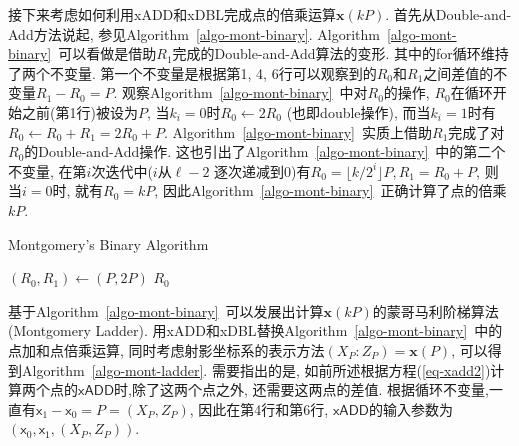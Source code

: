 
接下来考虑如何利用\textsf{xADD}和\textsf{xDBL}完成点的倍乘运算$\mathbf{x}(kP)$.
首先从Double-and-Add方法说起, 参见Algorithm~\ref{algo-mont-binary}. 
Algorithm~\ref{algo-mont-binary}~可以看做是借助$R_1$完成的Double-and-Add算法的变形.
其中的\textsf{for}循环维持了两个不变量. 
第一个不变量是根据第1, 4, 6行可以观察到的$R_0$和$R_1$之间差值的不变量$R_1-R_0 = P$.
观察Algorithm~\ref{algo-mont-binary}~中对$R_0$的操作, $R_0$在循环开始之前(第1行)被设为$P$,
当$k_i=0$时$R_0\leftarrow 2R_0$ (也即double操作), 
而当$k_i=1$时有$R_0\leftarrow R_0 + R_1 = 2R_0 + P$.
Algorithm~\ref{algo-mont-binary}~实质上借助$R_1$完成了对$R_0$的Double-and-Add操作.
这也引出了Algorithm~\ref{algo-mont-binary}~中的第二个不变量, 在第$i$次迭代中($i$从$\ell-2$
逐次递减到0)有$R_0 = \lfloor k/2^i \rfloor P, R_1 = R_0 + P$, 则当$i = 0$时, 就有$R_0 = kP$,
因此Algorithm~\ref{algo-mont-binary}~正确计算了点的倍乘$kP$.

\begin{algorithm}[h]
\caption{Montgomery's Binary Algorithm}%
\label{algo-mont-binary}
\LinesNumbered %
$(R_0, R_1)  \leftarrow (P, 2P)$\; %
\Return $R_0$
\end{algorithm}

基于Algorithm~\ref{algo-mont-binary}~可以发展出计算$\mathbf{x}(kP)$的蒙哥马利阶梯算法(Montgomery Ladder).
用\textsf{xADD}和\textsf{xDBL}替换Algorithm~\ref{algo-mont-binary}~中的点加和点倍乘运算,
同时考虑射影坐标系的表示方法$(X_P:Z_P) = \mathbf{x}(P)$, 可以得到Algorithm~\ref{algo-mont-ladder}.
需要指出的是, 如前所述根据方程(\ref{eq-xadd2})计算两个点的$\textsf{xADD}$时,除了这两个点之外,
还需要这两点的差值. 根据循环不变量,一直有$\textsf{x}_1 - \textsf{x}_0 = P =  (X_P, Z_P)$, 
因此在第4行和第6行, $\textsf{xADD}$的输入参数为$(\textsf{x}_0, \textsf{x}_1, (X_P, Z_P))$.

